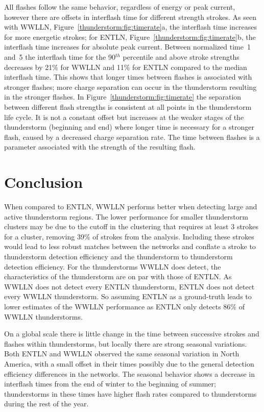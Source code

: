 All flashes follow the same behavior, regardless of energy or peak current, however there are offsets in interflash time for different strength strokes.
As seen with WWLLN, Figure~\ref{thunderstorm:fig:timerate}a, the interflash time increases for more energetic strokes; for ENTLN, Figure~\ref{thunderstorm:fig:timerate}b, the interflash time increases for absolute peak current.
Between normalized time~1 and~5 the interflash time for the 90$^{th}$ percentile and above stroke strengths decreases by 21\% for WWLLN and 11\% for ENTLN compared to the median interflash time.
This shows that longer times between flashes is associated with stronger flashes; more charge separation can occur in the thunderstorm resulting in the stronger flashes.
In Figure~\ref{thunderstorm:fig:timerate} the separation between different flash strengths is consistent at all points in the thunderstorm life cycle.
It is not a constant offset but increases at the weaker stages of the thunderstorm (beginning and end) where longer time is necessary for a stronger flash, caused by a decreased charge separation rate.
The time between flashes is a parameter associated with the strength of the resulting flash.

\section{Conclusion}


When compared to ENTLN, WWLLN performs better when detecting large and active thunderstorm regions.
The lower performance for smaller thunderstorm clusters may be due to the cutoff in the clustering that requires at least 3 strokes for a cluster, removing 39\% of strokes from the analysis.
Including these strokes would lead to less robust matches between the networks and conflate a stroke to thunderstorm detection efficiency and the thunderstorm to thunderstorm detection efficiency.
For the thunderstorms WWLLN does detect, the characteristics of the thunderstorm are on par with those of ENTLN.
As WWLLN does not detect every ENTLN thunderstorm, ENTLN does not detect every WWLLN thunderstorm.
So assuming ENTLN as a ground-truth leads to lower estimates of the WWLLN performance as ENTLN only detects 86\% of WWLLN thunderstorms.


On a global scale there is little change in the time between successive strokes and flashes within thunderstorms, but locally there are strong seasonal variations.
Both ENTLN and WWLLN observed the same seasonal variation in North America, with a small offset in their times possibly due to the general detection efficiency differences in the networks.
The seasonal behavior shows a decrease in interflash times from the end of winter to the beginning of summer; thunderstorms in these times have higher flash rates compared to thunderstorms during the rest of the year.

